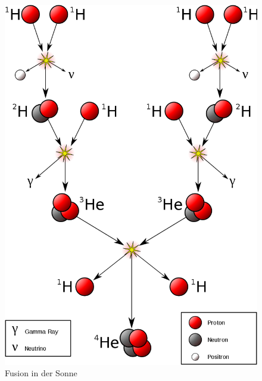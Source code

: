 \documentclass[10pt,a4paper, ngerman]{beamer}
\begin{document}
\begin{frame}[fragile]{\subsecname}{\secname}
\begin{figure}
\centering
\includegraphics[height=0.8\textheight]{fusion-in-der-sonne}
\caption{Fusion in der Sonne}
\label{fig:fusion-in-der-sonne}
\end{figure}
\end{frame}
\end{document}
